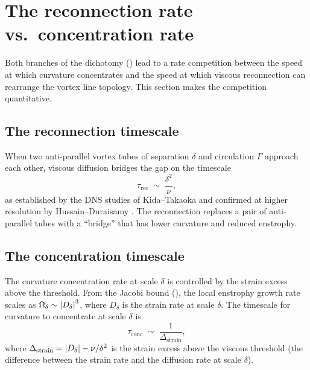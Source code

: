 \section{The reconnection rate vs.\ concentration rate}\label{sec:det-reconnection}

Both branches of the dichotomy () lead to a rate
competition between the speed at which curvature concentrates and the speed
at which viscous reconnection can rearrange the vortex line topology.
This section makes the competition quantitative.

\subsection{The reconnection timescale}\label{sec:det-reconnection-time}

When two anti-parallel vortex tubes of separation $\delta$ and circulation
$\Gamma$ approach each other, viscous diffusion bridges the gap on the
timescale
\begin{equation}\label{eq:reconnection-time}
  \tau_{\mathrm{rec}} \;\sim\; \frac{\delta^2}{\nu},
\end{equation}
as established by the DNS studies of Kida--Takaoka \cite{kidaTakaoka1994}
and confirmed at higher resolution by Hussain--Duraisamy
\cite{hussainDuraisamy2011}.
The reconnection replaces a pair of anti-parallel tubes with a ``bridge'' that
has lower curvature and reduced enstrophy.

\subsection{The concentration timescale}\label{sec:det-concentration-time}

The curvature concentration rate at scale $\delta$ is controlled by the strain
excess above the threshold.  From the Jacobi bound (),
the local enstrophy growth rate scales as $\Omega_\delta \sim \left\lvert D_\delta \right\rvert^3$,
where $D_\delta$ is the strain rate at scale $\delta$.  The timescale for curvature
to concentrate at scale $\delta$ is
\begin{equation}\label{eq:concentration-time}
  \tau_{\mathrm{conc}} \;\sim\; \frac{1}{\Delta_{\mathrm{strain}}},
\end{equation}
where $\Delta_{\mathrm{strain}} = \left\lvert D_\delta \right\rvert - \nu/\delta^2$ is the strain
excess above the viscous threshold (the difference between the strain rate and
the diffusion rate at scale $\delta$).

